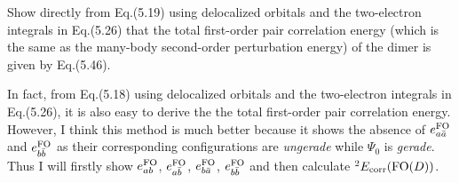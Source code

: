 \documentclass[a4paper]{book}
\newcounter{exercise}[chapter]
\newcounter{solution}[chapter]
\newcommand{\corr}{{\rm corr}}
\newcommand{\FO}{{\rm FO}}
\begin{document}
	\begin{exercise}
	Show directly from Eq.(5.19) using delocalized orbitals and the two-electron integrals in Eq.(5.26) that the total first-order pair correlation energy (which is the same as the many-body second-order perturbation energy) of the dimer is given by Eq.(5.46).
	\end{exercise}
	
	\begin{solution}
	In fact, from Eq.(5.18) using delocalized orbitals and the two-electron integrals in Eq.(5.26), it is also easy to derive the the total first-order pair correlation energy. However, I think this method is much better because it shows the absence of $e^\FO_{a\bar{a}}$ and $e^\FO_{b\bar{b}}$ as their corresponding configurations are {\it ungerade} while $\Psi_0$ is {\it gerade}. Thus I will firstly show $e^\FO_{ab}$, $e^\FO_{a\bar{b}}$, $e^\FO_{b\bar{a}}$, $e^\FO_{b\bar{b}}$ and then calculate $^2 E_\corr( {\rm FO}(D) )$. 
	

\end{solution}
\end{document}

